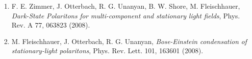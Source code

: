 \documentclass[10pt,centered]{./res} %
\begin{document}
\begin{resume}
\begin{enumerate}
  \item F. E. Zimmer, J. Otterbach, R. G. Unanyan, B. W. Shore, M. Fleischhauer, \textit{Dark-State Polaritons for multi-component and stationary light fields}, Phys. Rev. A 77, 063823 (2008).
  
  \item M. Fleischhauer, J. Otterbach, R. G. Unanyan, \textit{Bose-Einstein condensation of stationary-light polaritons}, Phys. Rev. Lett. 101, 163601 (2008).

\end{enumerate}




\end{resume}
\end{document}
